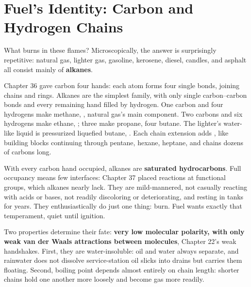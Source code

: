 \section{Fuel's Identity: Carbon and Hydrogen Chains}

What burns in these flames? Microscopically, the answer is surprisingly repetitive: natural gas, lighter gas, gasoline, kerosene, diesel, candles, and asphalt all consist mainly of \textbf{alkanes}.

Chapter 36 gave carbon four hands: each atom forms four single bonds, joining chains and rings. Alkanes are the simplest family, with only single carbon--carbon bonds and every remaining hand filled by hydrogen. One carbon and four hydrogens make methane, , natural gas's main component. Two carbons and six hydrogens make ethane, ; three make propane, four butane. The lighter's water-like liquid is pressurized liquefied butane, . Each chain extension adds , like building blocks continuing through pentane, hexane, heptane, and chains dozens of carbons long.

With every carbon hand occupied, alkanes are \textbf{saturated hydrocarbons}. Full occupancy means few interfaces: Chapter 37 placed reactions at functional groups, which alkanes nearly lack. They are mild-mannered, not casually reacting with acids or bases, not readily discoloring or deteriorating, and resting in tanks for years. They enthusiastically do just one thing: burn. Fuel wants exactly that temperament, quiet until ignition.

Two properties determine their fate: \textbf{very low molecular polarity, with only weak van der Waals attractions between molecules}, Chapter 22's weak handshakes. First, they are water-insoluble: oil and water always separate, and rainwater does not dissolve service-station oil slicks into drains but carries them floating. Second, boiling point depends almost entirely on chain length: shorter chains hold one another more loosely and become gas more readily.


